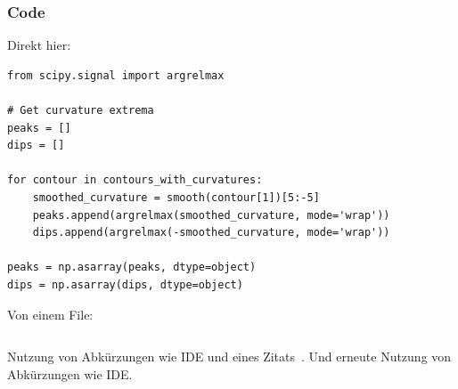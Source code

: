 \subsubsection{Code}

Direkt hier:

\begin{verbatim}
from scipy.signal import argrelmax

# Get curvature extrema
peaks = []
dips = []

for contour in contours_with_curvatures:
    smoothed_curvature = smooth(contour[1])[5:-5]
    peaks.append(argrelmax(smoothed_curvature, mode='wrap'))
    dips.append(argrelmax(-smoothed_curvature, mode='wrap'))

peaks = np.asarray(peaks, dtype=object)
dips = np.asarray(dips, dtype=object)
\end{verbatim}

\hspace{1cm}

Von einem File:

\inputminted[firstline=10, lastline=22]{python}{code/filterPeaksAndDips.txt}

Nutzung von Abkürzungen wie \ac{IDE} und eines Zitats~\cite{Selinger.2003}.
Und erneute Nutzung von Abkürzungen wie \ac{IDE}.